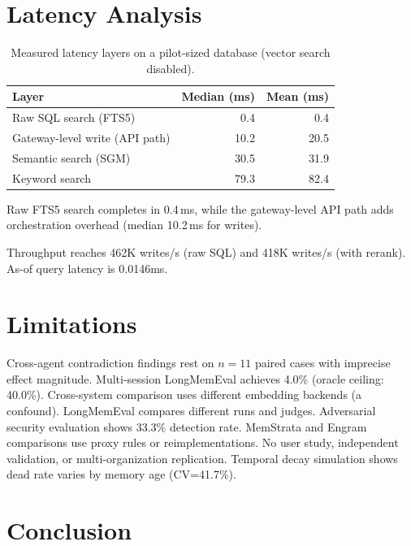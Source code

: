 \documentclass{llncs}
\begin{document}
\section{Latency Analysis}


\begin{table}[h]
\centering
\caption{Measured latency layers on a pilot-sized database (vector search disabled).}
\begin{tabular}{lrr}
\toprule
Layer & Median (ms) & Mean (ms) \\
\midrule
Raw SQL search (FTS5) & 0.4 & 0.4 \\
Gateway-level write (API path) & 10.2 & 20.5 \\
Semantic search (SGM) & 30.5 & 31.9 \\
Keyword search & 79.3 & 82.4 \\
\bottomrule
\end{tabular}
\end{table}

Raw FTS5 search completes in 0.4\,ms, while the gateway-level API path adds orchestration overhead (median 10.2\,ms for writes).

Throughput reaches 462K writes/s (raw SQL) and 418K writes/s (with rerank). As-of query latency is 0.0146ms.

\section{Limitations}

Cross-agent contradiction findings rest on $n{=}11$ paired cases with imprecise effect magnitude. Multi-session LongMemEval achieves 4.0\% (oracle ceiling: 40.0\%). Cross-system comparison uses different embedding backends (a confound). LongMemEval compares different runs and judges. Adversarial security evaluation shows 33.3\% detection rate. MemStrata and Engram comparisons use proxy rules or reimplementations. No user study, independent validation, or multi-organization replication. Temporal decay simulation shows dead rate varies by memory age (CV=41.7\%).
\section{Conclusion}
\end{document}

